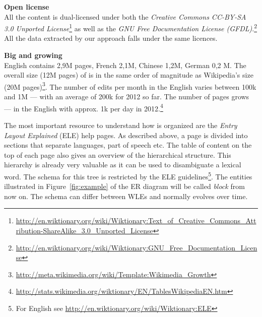 \begin{compactitem}
  \item \textbf{Open license}\\
    All the content is dual-licensed under both the \textit{Creative Commons CC-BY-SA 3.0 Unported License}\footnote{\url{http://en.wiktionary.org/wiki/Wiktionary:Text_of_Creative_Commons_Attribution-ShareAlike_3.0_Unported_License}} as well as the \textit{GNU Free Documentation License (GFDL)}.\footnote{\url{http://en.wiktionary.org/wiki/Wiktionary:GNU_Free_Documentation_License}}
    All the data extracted by our approach falls under the same licences. 
  \item \textbf{Big and growing}\\
    English contains 2,9M pages, French 2,1M, Chinese 1,2M, German 0,2 M.
    The overall size (12M pages) of \wik is in the same order of magnitude as Wiki\-pedia's size (20M pages)\footnote{\url{http://meta.wikimedia.org/wiki/Template:Wikimedia_Growth}}. 
    The number of edits per month in the English \wik varies between 100k and 1M --- with an average of 200k for 2012 so far. 
    The number of pages grows --- in the English \wik with approx. 1k per day in 2012.\footnote{\url{http://stats.wikimedia.org/wiktionary/EN/TablesWikipediaEN.htm}}
\end{compactitem}
\vspace{0.5cm}
The most important resource to understand how \wik is organized are the \textit{Entry Layout Explained} (ELE) help pages.
As described above, a page is divided into sections that separate languages, part of speech etc. 
The table of content on the top of each page also gives an overview of the hierarchical structure. 
This hierarchy is already very valuable as it can be used to disambiguate a lexical word. 
The schema for this tree is restricted by the ELE guidelines\footnote{For English see \url{http://en.wiktionary.org/wiki/Wiktionary:ELE}}. 
The entities illustrated in Figure~\ref{fig:example} of the ER diagram will be called \textit{block} from now on. 
The schema can differ between WLEs and normally evolves over time.

